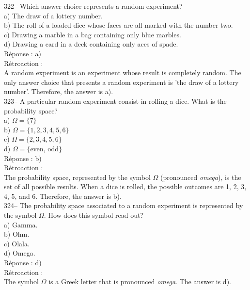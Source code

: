 \documentclass[letterpaper, 12pt]{article}
\begin{document}
322-- Which answer choice represents a random experiment?\\

a) The draw of a lottery number.\\
b) The roll of a loaded dice whose faces are all marked with the number two.\\
c) Drawing a marble in a bag containing only blue marbles.\\
d) Drawing a card in a deck containing only aces of spade.\\

R\'eponse : a)\\

R\'etroaction :\\
A random experiment is an experiment whose result is completely random. The only answer choice that
presents a random experiment is 'the draw of a lottery number'. Therefore, the answer is a).\\

323-- A particular random experiment consist in rolling a dice. What is the probability space?\\

a) $\Omega=\{7\}$\\
b) $\Omega=\{1, 2, 3, 4, 5, 6\}$\\
c) $\Omega=\{2, 3, 4, 5, 6\}$\\
d) $\Omega=\{$even, odd$\}$\\

R\'eponse : b)\\

R\'etroaction : \\
The probability space, represented by the symbol $\Omega$ (pronounced \emph{omega}), is the set of all possible results. When a dice is rolled, the possible outcomes are 1, 2, 3, 4, 5, and 6. Therefore, the answer is b).\\

324-- The probability space associated to a random experiment is represented by the symbol $\Omega$. How does this symbol read out?\\

a) Gamma.\\
b) Ohm.\\
c) Olala.\\
d) Omega.\\

R\'eponse : d)\\

R\'etroaction : \\
The symbol $\Omega$ is a Greek letter that is  pronounced \emph{omega}. The answer is d).\\
\end{document}
